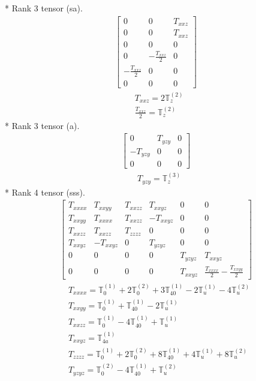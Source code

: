 \documentclass[fleqn,8pt,landscape]{jsarticle}
\begin{document}
* Rank 3 tensor (sa).
\begin{align*}
\begin{bmatrix} 0 & 0 & T_{xxz} \\ 0 & 0 & T_{xxz} \\ 0 & 0 & 0 \\ 0 & - \frac{T_{xxz}}{2} & 0 \\ - \frac{T_{xxz}}{2} & 0 & 0 \\ 0 & 0 & 0 \end{bmatrix}
\end{align*}
\begin{align*}
& T_{xxz} = 2 \mathbb{T}_{z}^{(2)} \\
& \frac{T_{xxz}}{2} = \mathbb{T}_{z}^{(2)}
\end{align*}
* Rank 3 tensor (a).
\begin{align*}
\begin{bmatrix} 0 & T_{yzy} & 0 \\ - T_{yzy} & 0 & 0 \\ 0 & 0 & 0 \end{bmatrix}
\end{align*}
\begin{align*}
& T_{yzy} = \mathbb{T}_{z}^{(3)}
\end{align*}
* Rank 4 tensor (sss).
\begin{align*}
\begin{bmatrix} T_{xxxx} & T_{xxyy} & T_{xxzz} & T_{xxyz} & 0 & 0 \\ T_{xxyy} & T_{xxxx} & T_{xxzz} & - T_{xxyz} & 0 & 0 \\ T_{xxzz} & T_{xxzz} & T_{zzzz} & 0 & 0 & 0 \\ T_{xxyz} & - T_{xxyz} & 0 & T_{yzyz} & 0 & 0 \\ 0 & 0 & 0 & 0 & T_{yzyz} & T_{xxyz} \\ 0 & 0 & 0 & 0 & T_{xxyz} & \frac{T_{xxxx}}{2} - \frac{T_{xxyy}}{2} \end{bmatrix}
\end{align*}
\begin{align*}
& T_{xxxx} = \mathbb{T}_{0}^{(1)} + 2 \mathbb{T}_{0}^{(2)} + 3 \mathbb{T}_{40}^{(1)} - 2 \mathbb{T}_{u}^{(1)} - 4 \mathbb{T}_{u}^{(2)} \\
& T_{xxyy} = \mathbb{T}_{0}^{(1)} + \mathbb{T}_{40}^{(1)} - 2 \mathbb{T}_{u}^{(1)} \\
& T_{xxzz} = \mathbb{T}_{0}^{(1)} - 4 \mathbb{T}_{40}^{(1)} + \mathbb{T}_{u}^{(1)} \\
& T_{xxyz} = \mathbb{T}_{4a}^{(1)} \\
& T_{zzzz} = \mathbb{T}_{0}^{(1)} + 2 \mathbb{T}_{0}^{(2)} + 8 \mathbb{T}_{40}^{(1)} + 4 \mathbb{T}_{u}^{(1)} + 8 \mathbb{T}_{u}^{(2)} \\
& T_{yzyz} = \mathbb{T}_{0}^{(2)} - 4 \mathbb{T}_{40}^{(1)} + \mathbb{T}_{u}^{(2)}
\end{align*}
\end{document}
